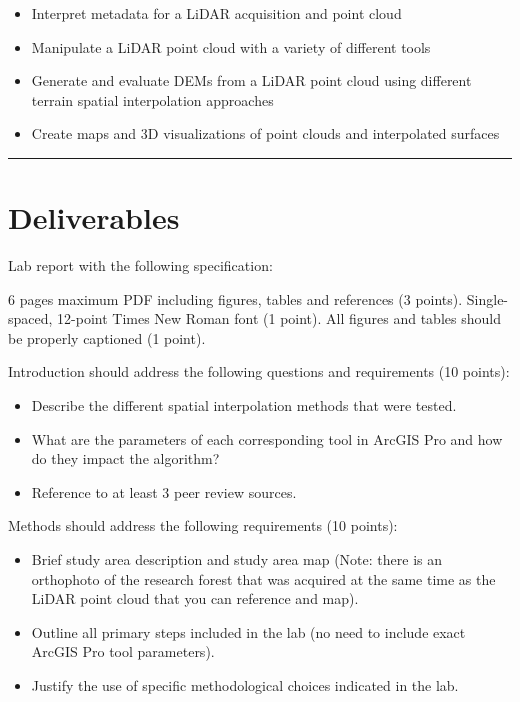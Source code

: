 \documentclass[
]{book}
\begin{document}
\begin{itemize}
\item
  Interpret metadata for a LiDAR acquisition and point cloud
\item
  Manipulate a LiDAR point cloud with a variety of different tools
\item
  Generate and evaluate DEMs from a LiDAR point cloud using different terrain spatial interpolation approaches
\item
  Create maps and 3D visualizations of point clouds and interpolated surfaces
\end{itemize}

\begin{center}\rule{0.5\linewidth}{0.5pt}\end{center}

\hypertarget{lab1-deliverables}{%
\section*{Deliverables}\label{lab1-deliverables}}

Lab report with the following specification:

6 pages maximum PDF including figures, tables and references (3 points). Single-spaced, 12-point Times New Roman font (1 point). All figures and tables should be properly captioned (1 point).

Introduction should address the following questions and requirements (10 points):

\begin{itemize}
\item
  Describe the different spatial interpolation methods that were tested.
\item
  What are the parameters of each corresponding tool in ArcGIS Pro and how do they impact the algorithm?
\item
  Reference to at least 3 peer review sources.
\end{itemize}

Methods should address the following requirements (10 points):

\begin{itemize}
\item
  Brief study area description and study area map (Note: there is an orthophoto of the research forest that was acquired at the same time as the LiDAR point cloud that you can reference and map).
\item
  Outline all primary steps included in the lab (no need to include exact ArcGIS Pro tool parameters).
\item
  Justify the use of specific methodological choices indicated in the lab.
\end{itemize}
\end{document}
